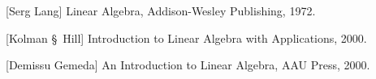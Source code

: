 \documentclass[12pt]{article}
\theoremstyle{definition}
\theoremstyle{remark}
\begin{document}
\newpage

 \begin{thebibliography}{9}

[Serg Lang]
Linear Algebra,
Addison-Wesley Publishing, 1972.

[Kolman \S ~Hill]
Introduction to Linear Algebra with Applications, 2000.

[Demissu Gemeda]
An Introduction to Linear Algebra,
AAU Press, 2000.

\end{thebibliography}
\end{document}
